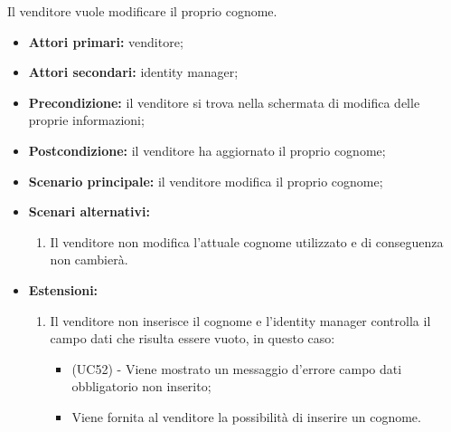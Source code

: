 Il venditore vuole modificare il proprio cognome.
\begin{itemize}
	\item \textbf{Attori primari:} venditore;
	\item \textbf{Attori secondari:} identity manager;
	\item \textbf{Precondizione:} il venditore si trova nella schermata di modifica delle proprie informazioni;
	\item \textbf{Postcondizione:} il venditore ha aggiornato il proprio cognome;
	\item \textbf{Scenario principale:} il venditore modifica il proprio cognome;
	\item \textbf{Scenari alternativi:}
	\begin{enumerate}[label=\lett]
		\item Il venditore non modifica l'attuale cognome utilizzato e di conseguenza non cambierà.
	\end{enumerate}
	\item \textbf{Estensioni:}
	\begin{enumerate}[label=\lett]
		\item Il venditore non inserisce il cognome e l'identity manager controlla il campo dati che risulta essere vuoto, in questo caso:
		\begin{itemize}
			\item (UC52) - Viene mostrato un messaggio d'errore campo dati obbligatorio non inserito;
			\item Viene fornita al venditore la possibilità di inserire un cognome.
		\end{itemize}
	\end{enumerate} 
\end{itemize}

